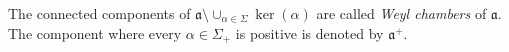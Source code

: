 The connected components of $\mathfrak{a} \setminus \cup_{\alpha \in \Sigma} \ker(\alpha)$ 
are called {\em Weyl chambers} of $\mathfrak{a}$. 
The component where every $\alpha \in \Sigma_+$ is positive is denoted by $\mathfrak{a}^+$. 


%
%
%

%	


